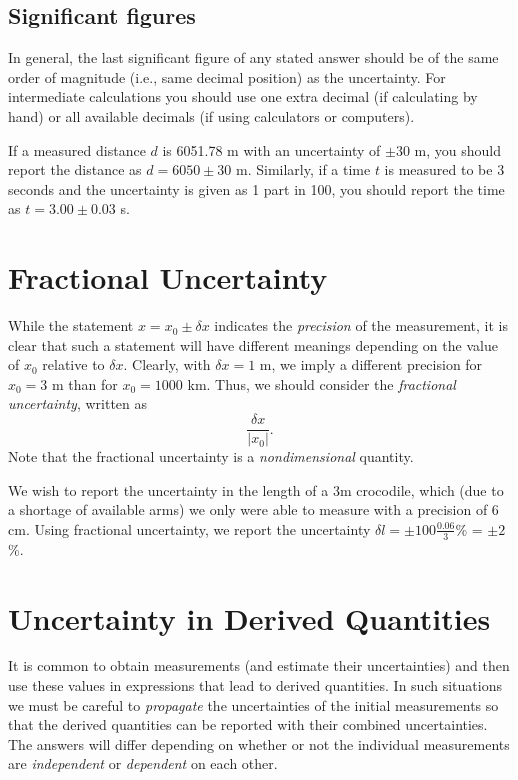\subsection{Significant figures}

In general, the last significant figure of any stated answer should be of the same 
order of magnitude (i.e., same decimal position) as the uncertainty.
For intermediate calculations you should use one extra decimal (if calculating by 
hand) or all available decimals (if using calculators or computers).
\begin{example}
If a measured distance $d$ is 6051.78 m with an uncertainty of $\pm 30$ m, you should report the 
distance as $d = 6050 \pm 30$ m.  Similarly, if a time $t$ is measured to be 3 seconds and the
uncertainty is given as 1 part in 100, you should report the time as $t = 3.00 \pm 0.03$ s.
\end{example}
\section{Fractional Uncertainty}

While the statement $x = x_0 \pm \delta x$ indicates the \emph{precision} of the measurement, it is clear that 
such a statement will have different meanings depending on the value of $x_0$ relative to $\delta x$.  
Clearly, with $\delta x = 1$ m, we imply a different precision for $x_0 = 3$ m than for $x_0 = 1000$ km.  Thus, we 
should consider the \emph{fractional uncertainty}, written as
\begin{equation}
\displaystyle \frac{ \delta x}{\left| x_0\right |}.
\end{equation}
Note that the fractional uncertainty is a \emph{nondimensional} quantity.
\begin{example}
We wish to report the uncertainty in the length of a 3m crocodile, which (due to a shortage of available arms)
we only were able to measure with a precision of 6 cm.  Using fractional uncertainty,
we report the uncertainty $\delta l = \pm 100 \frac{0.06}{3}$\% = $\pm2$\%.
\end{example}

\section{Uncertainty in Derived Quantities}
It is common to obtain measurements (and estimate their uncertainties) and then use these values in expressions
that lead to derived quantities.  In such situations we must be careful to \emph{propagate} the uncertainties
of the initial measurements so that the derived quantities can be reported with their combined uncertainties.
The answers will differ depending on whether or not the individual measurements are
\emph{independent} or \emph{dependent} on each other.

